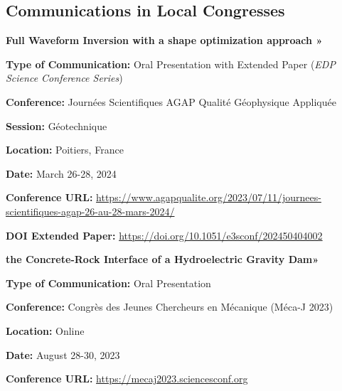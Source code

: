 \documentclass[10pt]{article} %
\begin{document}



\subsection{Communications in Local Congresses}
{\vspace{-0.13cm}\textbf{Full Waveform Inversion with a shape optimization approach »}
	
\textbf{Type of Communication:} Oral Presentation with Extended Paper (\textit{EDP Science Conference Series})
	
	\textbf{Conference:} Journées Scientifiques AGAP Qualité Géophysique Appliquée

	\textbf{Session:} Géotechnique 
	
	\textbf{Location:} Poitiers, France
	
	\textbf{Date:} March 26-28, 2024
	
	\textbf{Conference URL:} \href{https://www.agapqualite.org/2023/07/11/journees-scientifiques-agap-26-au-28-mars-2024/}{https://www.agapqualite.org/2023/07/11/journees-scientifiques-agap-26-au-28-mars-2024/}

\textbf{DOI Extended Paper:} \href{https://doi.org/10.1051/e3sconf/202450404002}{https://doi.org/10.1051/e3sconf/202450404002}


}




{\vspace{-0.13cm}\textbf{the Concrete-Rock Interface of a Hydroelectric Gravity Dam»}
	
	\textbf{Type of Communication:} Oral Presentation
	
	\textbf{Conference:} Congrès des Jeunes Chercheurs en Mécanique (Méca-J 2023)
	
	\textbf{Location:} Online
	
	\textbf{Date:} August 28-30,  2023
	
	\textbf{Conference URL:} \href{https://mecaj2023.sciencesconf.org/}{https://mecaj2023.sciencesconf.org}
}
\end{document}
